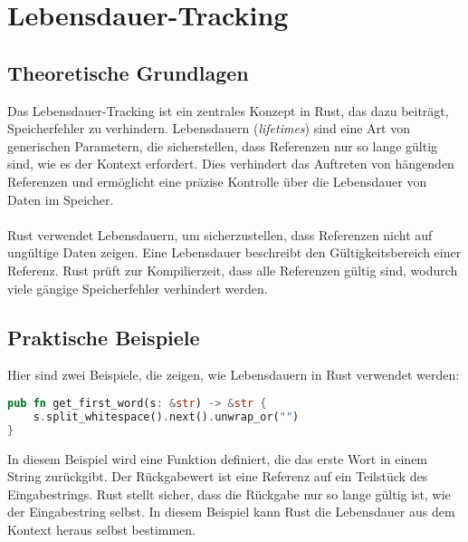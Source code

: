 \chapter{Lebensdauer-Tracking}

\section{Theoretische Grundlagen}
Das Lebensdauer-Tracking ist ein zentrales Konzept in Rust, das dazu beiträgt, Speicherfehler zu verhindern. 
Lebensdauern (\emph{lifetimes}) sind eine Art von generischen Parametern, die sicherstellen, dass Referenzen nur so lange gültig sind, wie es der Kontext erfordert. 
Dies verhindert das Auftreten von hängenden Referenzen und ermöglicht eine präzise Kontrolle über die Lebensdauer von Daten im Speicher.\\
\\
Rust verwendet Lebensdauern, um sicherzustellen, dass Referenzen nicht auf ungültige Daten zeigen. Eine Lebensdauer beschreibt den Gültigkeitsbereich einer Referenz. 
Rust prüft zur Kompilierzeit, dass alle Referenzen gültig sind, wodurch viele gängige Speicherfehler verhindert werden.

\section{Praktische Beispiele}
Hier sind zwei Beispiele, die zeigen, wie Lebensdauern in Rust verwendet werden:

\begin{lstlisting}[language=Rust, caption={Ermitteln des ersten Wortes}]
pub fn get_first_word(s: &str) -> &str {
    s.split_whitespace().next().unwrap_or("")
}
\end{lstlisting}
\noindent
In diesem Beispiel wird eine Funktion definiert, die das erste Wort in einem String zurückgibt. 
Der Rückgabewert ist eine Referenz auf ein Teilstück des Eingabestrings.
Rust stellt sicher, dass die Rückgabe nur so lange gültig ist, wie der Eingabestring selbst.
In diesem Beispiel kann Rust die Lebensdauer aus dem Kontext heraus selbst bestimmen.

